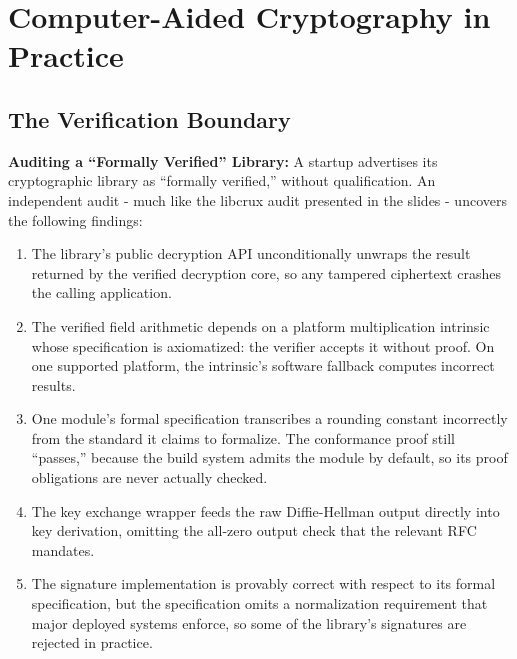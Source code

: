 \documentclass[10pt,a4paper,american]{exam}
\begin{document}
\section{Computer-Aided Cryptography in Practice}
\begin{questions}
	\subsection*{The Verification Boundary}

	\question[24] \textbf{Auditing a ``Formally Verified'' Library:}
	A startup advertises its cryptographic library as ``formally verified,'' without qualification. An independent audit - much like the libcrux audit presented in the slides - uncovers the following findings:
	\begin{enumerate}
		\item The library's public decryption API unconditionally unwraps the result returned by the verified decryption core, so any tampered ciphertext crashes the calling application.
		\item The verified field arithmetic depends on a platform multiplication intrinsic whose specification is axiomatized: the verifier accepts it without proof. On one supported platform, the intrinsic's software fallback computes incorrect results.
		\item One module's formal specification transcribes a rounding constant incorrectly from the standard it claims to formalize. The conformance proof still ``passes,'' because the build system admits the module by default, so its proof obligations are never actually checked.
		\item The key exchange wrapper feeds the raw Diffie-Hellman output directly into key derivation, omitting the all-zero output check that the relevant RFC mandates.
		\item The signature implementation is provably correct with respect to its formal specification, but the specification omits a normalization requirement that major deployed systems enforce, so some of the library's signatures are rejected in practice.
	\end{enumerate}

\end{questions}
\end{document}
